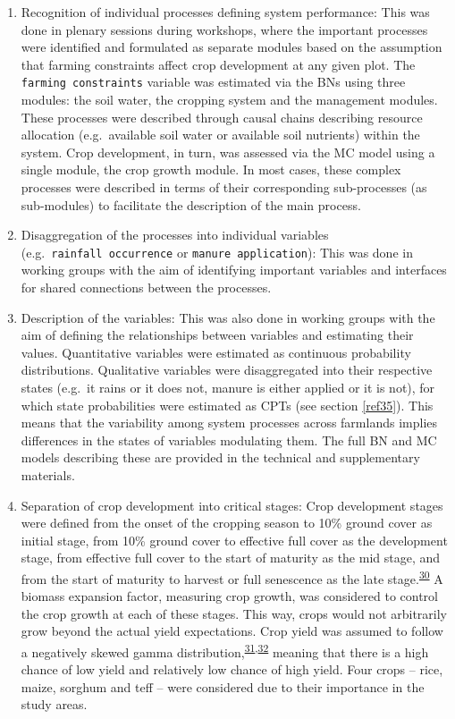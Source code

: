 \documentclass[]{elsarticle} %
\begin{document}
\begin{enumerate}
\def\labelenumi{\arabic{enumi}.}
\item
  Recognition of individual processes defining system performance: This was done in plenary sessions during workshops, where the important processes were identified and formulated as separate modules based on the assumption that farming constraints affect crop development at any given plot. The \texttt{farming\ constraints} variable was estimated via the BNs using three modules: the soil water, the cropping system and the management modules. These processes were described through causal chains describing resource allocation (e.g.~available soil water or available soil nutrients) within the system. Crop development, in turn, was assessed via the MC model using a single module, the crop growth module. In most cases, these complex processes were described in terms of their corresponding sub-processes (as sub-modules) to facilitate the description of the main process.
\item
  Disaggregation of the processes into individual variables (e.g.~\texttt{rainfall\ occurrence} or \texttt{manure\ application}): This was done in working groups with the aim of identifying important variables and interfaces for shared connections between the processes.
\item
  Description of the variables: This was also done in working groups with the aim of defining the relationships between variables and estimating their values. Quantitative variables were estimated as continuous probability distributions. Qualitative variables were disaggregated into their respective states (e.g.~it rains or it does not, manure is either applied or it is not), for which state probabilities were estimated as CPTs (see section \ref{ref35}). This means that the variability among system processes across farmlands implies differences in the states of variables modulating them. The full BN and MC models describing these are provided in the technical and supplementary materials.
\item
  Separation of crop development into critical stages: Crop development stages were defined from the onset of the cropping season to 10\% ground cover as initial stage, from 10\% ground cover to effective full cover as the development stage, from effective full cover to the start of maturity as the mid stage, and from the start of maturity to harvest or full senescence as the late stage.\textsuperscript{\protect\hyperlink{ref-Allen_et_al_1998}{30}} A biomass expansion factor, measuring crop growth, was considered to control the crop growth at each of these stages. This way, crops would not arbitrarily grow beyond the actual yield expectations. Crop yield was assumed to follow a negatively skewed gamma distribution,\textsuperscript{\protect\hyperlink{ref-Gallagher_1987}{31},\protect\hyperlink{ref-Ramirez_et_al_2003}{32}} meaning that there is a high chance of low yield and relatively low chance of high yield. Four crops -- rice, maize, sorghum and teff -- were considered due to their importance in the study areas.
\end{enumerate}
\end{document}
